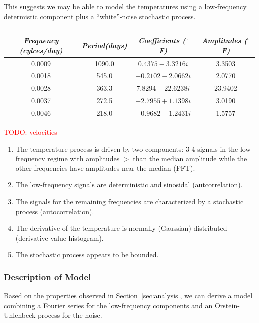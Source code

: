 \documentclass[11pt, letterpaper]{article}
\begin{document}
This suggests we may be able to model the temperatures using a low-frequency determistic component plus a ``white''-noise stochastic process.

\begin{table}[H]
  \centering
  \begin{tabular}{c c c c} \hline
  \emph{Frequency (cylces/day)} & \emph{Period(days)} & \emph{Coefficients ($^{\circ}$ F)} & \emph{Amplitudes ($^{\circ}$ F)}\\ \hline
  0.0009 & 1090.0 & $0.4375-3.3216i$ & 3.3503 \\ \hline
  0.0018 & 545.0 & $-0.2102-2.0662i$ & 2.0770 \\ \hline
  0.0028 & 363.3 & $7.8294+22.6238i$ & 23.9402 \\ \hline
  0.0037 & 272.5 & $-2.7955+1.1398i$ & 3.0190 \\ \hline
  0.0046 & 218.0 & $-0.9682-1.2431i$ & 1.5757 \\ \hline
  \end{tabular}
  \caption{}
  \label{tab:analysis-ft-values}
\end{table}

\textcolor{red}{TODO: velocities}

\begin{enumerate}
\item The temperature process is driven by two components: 3-4 signals in the low-frequency regime with amplitudes $>$ than the median amplitude while the other frequencies have amplitudes near the median (FFT).
\item The low-frequency signals are deterministic and sinosidal (autcorrelation).
\item The signals for the remaining frequencies are characterized by a stochastic process (autocorrelation).
\item The derivative of the temperature is normally (Gaussian) distributed (derivative value histogram).
\item The stochastic process appears to be bounded.
\end{enumerate}



\subsubsection{Description of Model}
Based on the properties observed in Section~\ref{sec:analysis}, we can derive a model combining a Fourier series for the low-frequency components and an Orstein-Uhlenbeck process for the noise.
\end{document}

